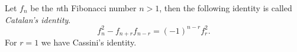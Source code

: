 \documentclass[12pt]{article}
\begin{document}
Let $f_n$ be the \emph{n}th Fibonacci number $n>1$, then the following identity is called \emph{Catalan's identity}.
$$f_n^2-f_{n+r}f_{n-r}=(-1)^{n-r}f_r^2.$$
For $r=1$ we have Cassini's identity.
\end{document}
